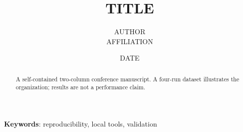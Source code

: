 \documentclass[twocolumn]{article}
\title{{{TITLE}}}
\author{{{AUTHOR}} \\ {{AFFILIATION}}}
\date{{{DATE}}}
\begin{document}
\maketitle
\begin{abstract}A self-contained two-column conference manuscript. A four-run dataset illustrates the organization; results are not a performance claim.\end{abstract}
\textbf{Keywords}: reproducibility, local tools, validation





\end{document}
